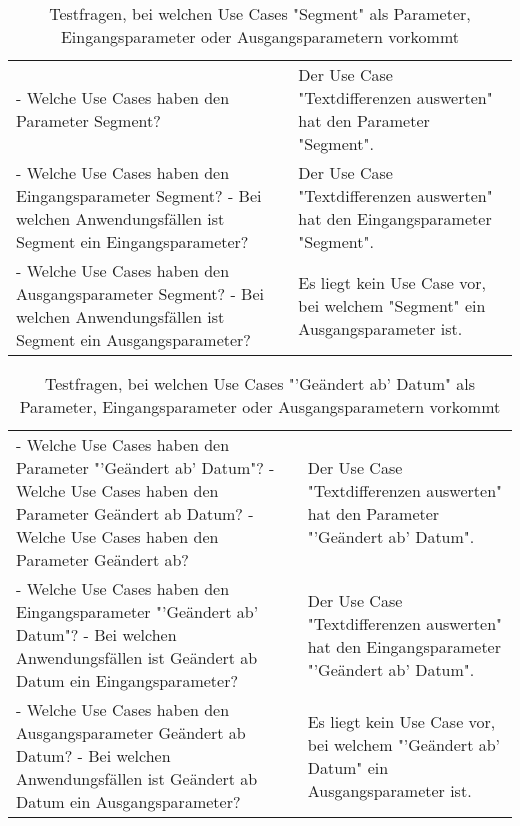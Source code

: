 \begin{table}[h]
	\myfloatalign
	\begin{tabularx}{\textwidth}{XX} \toprule
		\tableheadline{Fragen} & \tableheadline{Erwartete Antwort} \\
		\midrule
		- Welche Use Cases haben den Parameter Segment? & Der Use Case "Textdifferenzen auswerten" hat den Parameter "Segment". \\
		\midrule
		- Welche Use Cases haben den Eingangsparameter Segment? \newline - Bei welchen Anwendungsfällen ist Segment ein Eingangsparameter? & Der Use Case "Textdifferenzen auswerten" hat den Eingangsparameter "Segment". \\
		\midrule
		- Welche Use Cases haben den Ausgangsparameter Segment? \newline - Bei welchen Anwendungsfällen ist Segment ein Ausgangsparameter? & Es liegt kein Use Case vor, bei welchem "Segment" ein Ausgangsparameter ist. \\
		\bottomrule
	\end{tabularx}
	\caption[Testfragen, bei welchen Use Cases "Segment" als Parameter, Eingangsparameter oder  Ausgangsparametern vorkommt]{Testfragen, bei welchen Use Cases "Segment" als Parameter, Eingangsparameter oder  Ausgangsparametern vorkommt}
	\label{tab:testfragen:tbl16}
\end{table}
\begin{table}[h]
	\myfloatalign
	\begin{tabularx}{\textwidth}{XX} \toprule
		\tableheadline{Fragen} & \tableheadline{Erwartete Antwort} \\
		\midrule
		- Welche Use Cases haben den Parameter "'Geändert ab' Datum"? \newline - Welche Use Cases haben den Parameter Geändert ab Datum? \newline - Welche Use Cases haben den Parameter Geändert ab? & Der Use Case "Textdifferenzen auswerten" hat den Parameter "'Geändert ab' Datum". \\
		\midrule
		- Welche Use Cases haben den Eingangsparameter "'Geändert ab' Datum"? \newline - Bei welchen Anwendungsfällen ist Geändert ab Datum ein Eingangsparameter? & Der Use Case "Textdifferenzen auswerten" hat den Eingangsparameter "'Geändert ab' Datum". \\
		\midrule
		- Welche Use Cases haben den Ausgangsparameter Geändert ab Datum? \newline - Bei welchen Anwendungsfällen ist Geändert ab Datum ein Ausgangsparameter? & Es liegt kein Use Case vor, bei welchem "'Geändert ab' Datum" ein Ausgangsparameter ist. \\
		\bottomrule
	\end{tabularx}
	\caption[Testfragen, bei welchen Use Cases "'Geändert ab' Datum" als Parameter, Eingangsparameter oder  Ausgangsparametern vorkommt]{Testfragen, bei welchen Use Cases "'Geändert ab' Datum" als Parameter, Eingangsparameter oder  Ausgangsparametern vorkommt}
	\label{tab:testfragen:tbl17}
\end{table}
